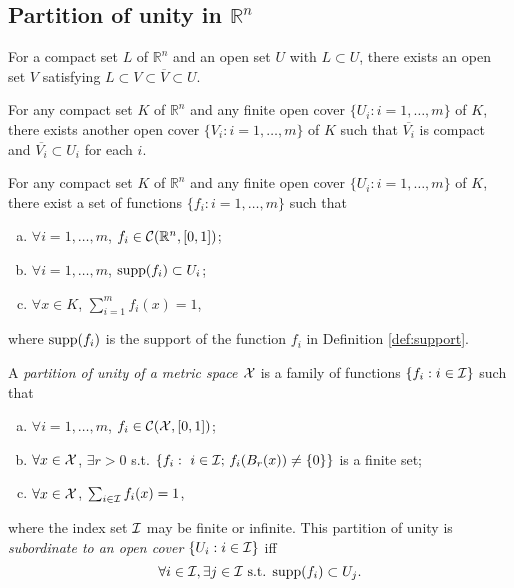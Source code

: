 \subsection{Partition of unity in $\mathbb{R}^n$}
\label{sec:partition-unity}

\begin{lem}
  \label{lem:sandwichCompact}
  For a compact set $L$ of $\mathbb{R}^n$
  and an open set $U$ with $L\subset U$, 
  there exists an open set $V$ satisfying
  $L\subset V\subset \overline{V}\subset U$.
\end{lem}

\begin{lem}
  \label{lem:sandwichCompactSequence}
  For any compact set $K$ of $\mathbb{R}^n$
  and any finite open cover $\{U_i: i=1, \ldots, m\}$ of $K$, 
  there exists another open cover $\{V_i: i=1, \ldots, m\}$
  of $K$
  such that $\overline{V_i}$ is compact and
  $\overline{V_i}\subset U_i$ for each $i$.
\end{lem}

\begin{thm}
  \label{thm:openCoverForCompactSets}
  For any compact set $K$ of $\mathbb{R}^n$
  and any finite open cover $\{U_i: i=1, \ldots, m\}$ of $K$, 
  there exist a set of functions
  $\{f_i: %
  i=1, \ldots, m\}$
  such that
  \begin{enumerate}[(a)]\itemsep0em
  \item $\forall i=1, \ldots, m$,
    $f_i\in {\cal C}(\mathbb{R}^n, [0,1])$; 
  \item $\forall i=1, \ldots, m$,
    $\mathrm{supp}(f_i)\subset U_i$; 
  \item $\forall x\in K$, $\sum_{i=1}^m f_i(x)=1$, 
  \end{enumerate}
  where $\mathrm{supp}(f_i)$ is the support of the function $f_i$
  in Definition \ref{def:support}.
\end{thm}

\begin{defn}
  \label{defn:partitionOfUnity}
  A \emph{partition of unity of a metric space ${\cal X}$}
  is a family of functions
  $\{f_i: i\in {\cal I}\}$ such that
  \begin{enumerate}[(a)]\itemsep0em
  \item $\forall i=1, \ldots, m$,
    $f_i\in {\cal C}({\cal X}, [0,1])$; 
  \item $\forall x\in {\cal X}$, 
    $\exists r>0$ s.t. 
    $\{f_i:\ i\in {\cal I};\, f_i(B_r(x))\ne \{0\}\}$
    is a finite set;
  \item $\forall x\in {\cal X}$, $\sum_{i\in{\cal I}} f_i(x)=1$, 
  \end{enumerate}
  where the index set ${\cal I}$ may be finite or infinite.
  This partition of unity is \emph{subordinate to an open cover}
  $\{U_i: i\in {\cal I}\}$ iff
  \begin{equation}
    \forall i\in{\cal I}, \exists j \in {\cal I} \text{ s.t. }
    \mathrm{supp}(f_i)\subset U_j. 
  \end{equation}
\end{defn}

